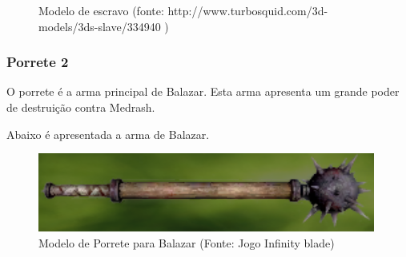\begin{itemize}
\begin{figure}[H]
 \caption{Modelo de escravo (fonte: http://www.turbosquid.com/3d-models/3ds-slave/334940 )}
\label{img:escrava}
\end{figure}
\end{itemize}
\subsubsection{Porrete 2}
O porrete é a arma principal de Balazar. Esta arma apresenta um grande poder de destruição contra Medrash.

Abaixo é apresentada a arma de Balazar.

\begin{figure}[H]
 \centering
 \includegraphics[scale=1]{Imagens/porrete02.png}
 \caption{Modelo de Porrete para Balazar (Fonte: Jogo Infinity blade)}
\label{img:porrete02}
\end{figure}